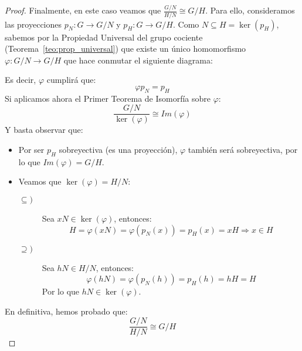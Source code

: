 \begin{teo}
\begin{proof}
        \noindent
        Finalmente, en este caso veamos que $\frac{G/N}{H/N}\cong G/H$. Para ello, consideramos las proyecciones $p_N:G\to G/N$ y $p_H:G\to G/H$. Como $N\subseteq H = \ker(p_H)$, sabemos por la Propiedad Universal del grupo cociente (Teorema~\ref{teo:prop_universal}) que existe un único homomorfismo $\varphi:G/N\to G/H$ que hace conmutar el siguiente diagrama:
        \begin{figure}[H]
            \centering
        \end{figure}
        Es decir, $\varphi$ cumplirá que:
        \begin{equation*}
            \varphi p_N = p_H
        \end{equation*}
        Si aplicamos ahora el Primer Teorema de Isomorfía sobre $\varphi$:
        \begin{equation*}
            \dfrac{G/N}{\ker(\varphi)} \cong Im(\varphi)
        \end{equation*}
        Y basta observar que:
        \begin{itemize}
            \item Por ser $p_H$ sobreyectiva (es una proyección), $\varphi$ también será sobreyectiva, por lo que $Im(\varphi) = G/H$.
            \item Veamos que $\ker(\varphi) = H/N$:
                \begin{description}
                    \item [$\subseteq)$] Sea $xN\in \ker(\varphi)$, entonces:
                        \begin{equation*}
                            H = \varphi(xN) = \varphi(p_N(x)) = p_H(x) = xH \Longrightarrow x\in H
                        \end{equation*}
                    \item [$\supseteq)$] Sea $hN\in H/N$, entonces:
                        \begin{equation*}
                            \varphi(hN) = \varphi(p_N(h)) = p_H(h) = hH = H 
                        \end{equation*}
                        Por lo que $hN \in \ker(\varphi)$.
                \end{description}
        \end{itemize}
        En definitiva, hemos probado que:
        \begin{equation*}
            \dfrac{G/N}{H/N} \cong G/H
        \end{equation*}
    \end{proof}
\end{teo}

